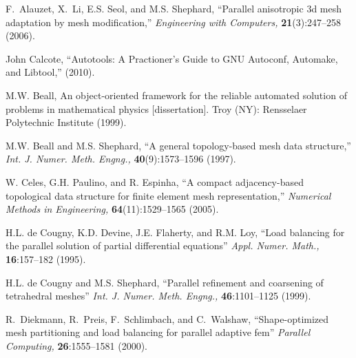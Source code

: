 \begin{thebibliography}{99}

F.~Alauzet, X.~Li, E.S. Seol, and M.S. Shephard, ``Parallel anisotropic 3d mesh adaptation by mesh modification,'' {\it Engineering with Computers,}  {\bf 21}(3):247--258 (2006).


John Calcote, ``Autotools: A Practioner's Guide to GNU Autoconf, Automake, and Libtool,'' (2010).


 M.W. Beall, An object-oriented framework for the reliable automated solution of problems in mathematical physics [dissertation]. Troy (NY): Rensselaer Polytechnic Institute (1999).

M.W. Beall and M.S. Shephard, ``A general topology-based mesh data structure,'' {\it Int. J. Numer. Meth. Engng.,} {\bf 40}(9):1573--1596 (1997).


W. Celes, G.H. Paulino, and R. Espinha, ``A compact adjacency-based topological data structure for finite element mesh representation,'' {\it Numerical Methods in Engineering,} {\bf 64}(11):1529--1565 (2005).


H.L. de Cougny, K.D. Devine, J.E. Flaherty, and R.M. Loy, ``Load balancing for the parallel solution of partial differential equations'' {\it Appl. Numer. Math.,} {\bf 16}:157--182 (1995).

H.L. de Cougny and M.S. Shephard, ``Parallel refinement and coarsening of tetrahedral meshes'' {\it Int. J. Numer. Meth. Engng.,} {\bf 46}:1101--1125 (1999).


R.~Diekmann, R.~Preis, F.~Schlimbach, and C.~Walshaw, ``Shape-optimized mesh partitioning and load balancing for parallel adaptive fem'' {\it Parallel Computing,} {\bf 26}:1555--1581 (2000).


\end{thebibliography}
